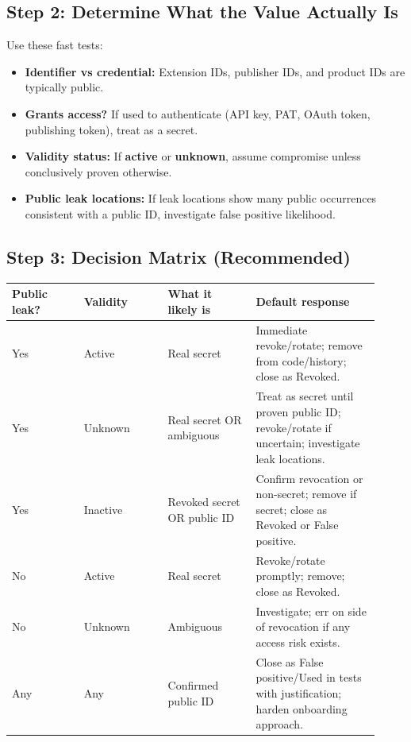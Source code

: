 \documentclass[11pt]{article}
\providecommand{\term}[1]{\textbf{#1}}
\begin{document}
\subsection{Step 2: Determine What the Value Actually Is}
Use these fast tests:
\begin{itemize}
  \item \textbf{Identifier vs credential:} Extension IDs, publisher IDs, and product IDs are typically public.
  \item \textbf{Grants access?} If used to authenticate (API key, PAT, OAuth token, publishing token), treat as a secret.
  \item \textbf{Validity status:} If \term{active} or \term{unknown}, assume compromise unless conclusively proven otherwise.
  \item \textbf{Public leak locations:} If leak locations show many public occurrences consistent with a public ID, investigate false positive likelihood.
\end{itemize}

\subsection{Step 3: Decision Matrix (Recommended)}
\begin{longtable}{@{}p{0.18\linewidth}p{0.21\linewidth}p{0.22\linewidth}p{0.31\linewidth}@{}}
\toprule
\textbf{Public leak?} & \textbf{Validity} & \textbf{What it likely is} & \textbf{Default response} \\
\midrule
Yes & Active & Real secret & Immediate revoke/rotate; remove from code/history; close as Revoked. \\
Yes & Unknown & Real secret OR ambiguous & Treat as secret until proven public ID; revoke/rotate if uncertain; investigate leak locations. \\
Yes & Inactive & Revoked secret OR public ID & Confirm revocation or non-secret; remove if secret; close as Revoked or False positive. \\
No & Active & Real secret & Revoke/rotate promptly; remove; close as Revoked. \\
No & Unknown & Ambiguous & Investigate; err on side of revocation if any access risk exists. \\
Any & Any & Confirmed public ID & Close as False positive/Used in tests with justification; harden onboarding approach. \\
\bottomrule
\end{longtable}
\end{document}
